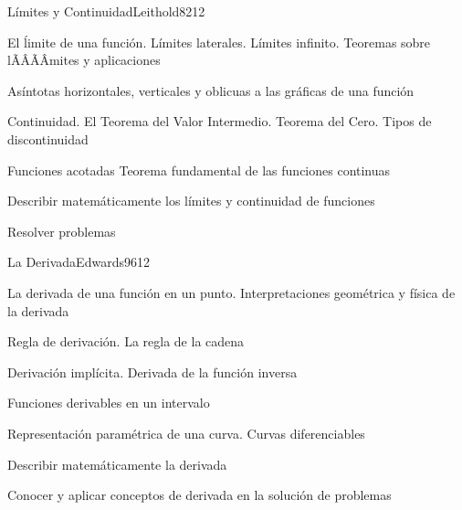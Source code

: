 \begin{sumilla}
\begin{unit}{L\'imites y Continuidad}{Leithold82}{12}
\begin{topicos}
      \item El \'limite de una funci\'on. L\'imites laterales. L\'imites  infinito. Teoremas sobre lÃÂÃÂ­mites y aplicaciones
      \item As\'intotas horizontales, verticales y oblicuas a las gr\'aficas de una funci\'on
      \item Continuidad. El Teorema del Valor Intermedio. Teorema del Cero. Tipos de discontinuidad
      \item Funciones acotadas Teorema fundamental de las funciones continuas
	\end{topicos}

   \begin{objetivos}
      \item Describir matem\'aticamente los l\'imites y continuidad de funciones
	\item Resolver problemas
   \end{objetivos}
\end{unit}

\begin{unit}{La Derivada}{Edwards96}{12}
\begin{topicos}
	\item La derivada de una funci\'on en un punto. Interpretaciones geom\'etrica y f\'isica de la derivada
	\item Regla de derivaci\'on. La regla de la cadena
	\item Derivaci\'on impl\'icita. Derivada de la funci\'on inversa
	\item Funciones derivables en un intervalo
	\item Representaci\'on param\'etrica de una curva. Curvas diferenciables
\end{topicos}

\begin{objetivos}
	\item Describir matem\'aticamente la derivada
	\item Conocer y aplicar conceptos de derivada en la soluci\'on de problemas
\end{objetivos}
\end{unit}


\end{sumilla}
